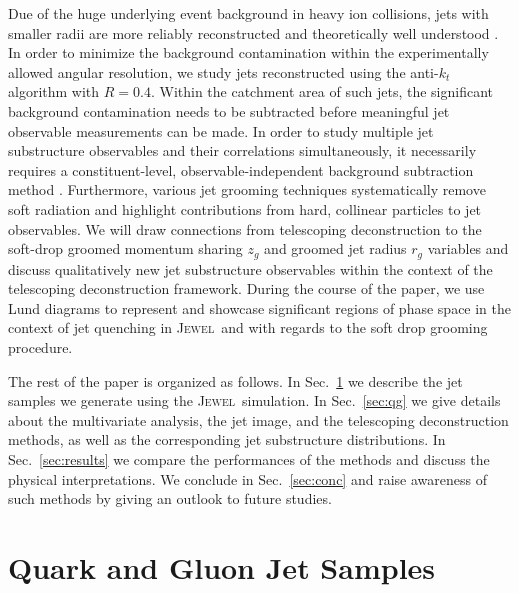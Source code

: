 \documentclass[notoc,preprintnumbers]{JHEP3}
\newcommand{\jw}{\textsc{Jewel}~}
\begin{document}
Due of the huge underlying event background in heavy ion collisions, jets with smaller radii are more reliably reconstructed and theoretically well understood \cite{Dasgupta:2014yra,Chien:2015cka,Becher:2015hka,Kang:2016mcy}. In order to minimize the background contamination within the experimentally allowed angular resolution, we study jets reconstructed using the anti-$k_t$ algorithm \cite{Cacciari:2008gp} with $R=0.4$. Within the catchment area of such jets, the significant background contamination needs to be subtracted before meaningful jet observable measurements can be made. In order to study multiple jet substructure observables and their correlations simultaneously, it necessarily requires a constituent-level, observable-independent background subtraction method \cite{Soyez:2012hv,Cacciari:2014gra,Berta:2014eza,Bertolini:2014bba,Komiske:2017ubm}. Furthermore, various jet grooming techniques \cite{Ellis:2009su,Ellis:2009me,Krohn:2009th,Dasgupta:2013ihk,Larkoski:2014wba} systematically remove soft radiation and highlight contributions from hard, collinear particles to jet observables. We will draw connections from telescoping deconstruction to the soft-drop groomed momentum sharing $z_g$ and groomed jet radius $r_g$ variables \cite{Larkoski:2014wba} and discuss qualitatively new jet substructure observables within the context of the telescoping deconstruction framework. During the course of the paper, we use Lund diagrams \cite{Andersson1989,Salam:2016yht} to represent and showcase significant regions of phase space in the context of jet quenching in \jw and with regards to the soft drop grooming procedure.

The rest of the paper is organized as follows. In Sec.~\ref{sec:sample} we describe the jet samples we generate using the \jw simulation. In Sec.~\ref{sec:qg} we give details about the multivariate analysis, the jet image, and the telescoping deconstruction methods, as well as the corresponding jet substructure distributions. In Sec.~\ref{sec:results} we compare the performances of the methods and discuss the physical interpretations. We conclude in Sec.~\ref{sec:conc} and raise awareness of such methods by giving an outlook to future studies.


\section{Quark and Gluon Jet Samples}
\label{sec:sample}
\end{document}
